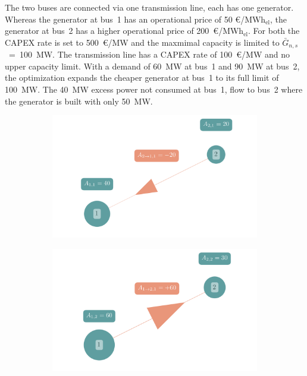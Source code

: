 \documentclass[11pt,twocolumn]{article}
\newcommand{\capacityGenerationUpper}{\bar{G}_{n,s}}
\newcommand{\megawatthour}{MWh$_\text{el}$}
\begin{document}
The two buses are connected via one transmission line, each has one generator. Whereas the generator at bus~1 has an operational price of 50 \euro/\megawatthour, the generator at bus~2 has a higher operational price of 200~\euro/\megawatthour. For both the CAPEX rate is set to 500~\euro/MW and the maxmimal capacity is limited to $\capacityGenerationUpper$~=~100~MW. The transmission line has a CAPEX rate of 100~\euro/MW and no upper capacity limit. With a demand of 60~MW at bus~1 and 90~MW at bus~2, the optimization expands the cheaper generator at bus~1 to its full limit of 100~MW. The 40~MW excess power not consumed at bus~1, flow to bus~2 where the generator is built with only 50~MW.  \\
\begin{figure}[h!]
    \begin{subfigure}[c]{\linewidth}
       \includegraphics[width=\linewidth]{../figures/example_allocation_bus1.png}
       \vspace{-30pt}
       \label{fig:example_allocation_bus1}
    \end{subfigure}
    \begin{subfigure}[c]{\linewidth}
       \includegraphics[width=\linewidth]{../figures/example_allocation_bus2.png}

\end{subfigure}
\end{figure}
\end{document}
